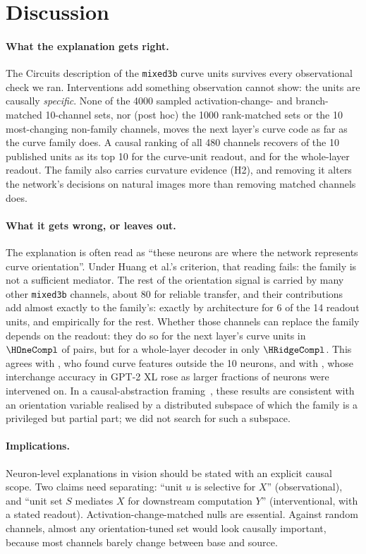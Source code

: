 \documentclass[11pt]{article}
\begin{document}
\section{Discussion}
\paragraph{What the explanation gets right.}
The Circuits description of the \texttt{mixed3b} curve units survives every observational check we ran. Interventions add something observation cannot show: the units are causally \emph{specific}. None of the 4000 sampled activation-change- and branch-matched 10-channel sets, nor (post hoc) the 1000 rank-matched sets or the 10 most-changing non-family channels, moves the next layer's curve code as far as the curve family does. A causal ranking of all 480 channels recovers \AuTopOverlap{} of the 10 published units as its top 10 for the curve-unit readout, and \TrRidgeOverlap{} for the whole-layer readout. The family also carries curvature evidence (H2), and removing it alters the network's decisions on natural images more than removing matched channels does.

\paragraph{What it gets wrong, or leaves out.}
The explanation is often read as ``these neurons are where the network represents curve orientation''. Under Huang et al.'s criterion, that reading fails: the family is not a sufficient mediator. The rest of the orientation signal is carried by many other \texttt{mixed3b} channels, about 80 for reliable transfer, and their contributions add almost exactly to the family's: exactly by architecture for 6 of the 14 readout units, and empirically for the rest. Whether those channels can replace the family depends on the readout: they do so for the next layer's curve units in $\HOneCompl$ of pairs, but for a whole-layer decoder in only $\HRidgeCompl$. This agrees with \citet{gorton2024missing}, who found curve features outside the 10 neurons, and with \citet{huang2023rigorously}, whose interchange accuracy in GPT-2 XL rose as larger fractions of neurons were intervened on. In a causal-abstraction framing~\cite{geiger2023abstraction}, these results are consistent with an orientation variable realised by a distributed subspace of which the family is a privileged but partial part; we did not search for such a subspace.

\paragraph{Implications.}
Neuron-level explanations in vision should be stated with an explicit causal scope. Two claims need separating: ``unit $u$ is selective for $X$'' (observational), and ``unit set $S$ mediates $X$ for downstream computation $Y$'' (interventional, with a stated readout). Activation-change-matched nulls are essential. Against random channels, almost any orientation-tuned set would look causally important, because most channels barely change between base and source.
\end{document}

